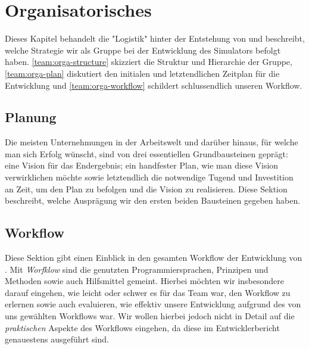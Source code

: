 
\section{Organisatorisches}
\label{team:orga}

Dieses Kapitel behandelt die "Logistik" hinter der Entstehung von \erasim{} und
beschreibt, welche Strategie wir als Gruppe bei der Entwicklung des Simulators
befolgt haben. \autoref{team:orga-structure} skizziert die Struktur und
Hierarchie der Gruppe, \autoref{team:orga-plan} diskutiert den initialen und
letztendlichen Zeitplan für die Entwicklung und
\autoref{team:orga-workflow} schildert schlussendlich unseren Workflow.



\subsection{Planung}
\label{team:orga-plan}

Die meisten Unternehmungen in der Arbeitswelt und darüber hinaus, für welche man
sich Erfolg wünscht, sind von drei essentiellen Grundbausteinen geprägt: eine
Vision für das Endergebnis; ein handfester Plan, wie man diese Vision
verwirklichen möchte sowie letztendlich die notwendige Tugend und Investition an
Zeit, um den Plan zu befolgen und die Vision zu realisieren. Diese Sektion
beschreibt, welche Ausprägung wir den ersten beiden Bausteinen gegeben haben.





\subsection{Workflow}
\label{team:orga-workflow}
\vspace{-0.3cm}

Diese Sektion gibt einen Einblick in den gesamten Workflow der Entwicklung von
\erasim{}. Mit \emph{Worfklow} sind die genutzten Programmiersprachen, Prinzipen
und Methoden sowie auch Hilfsmittel gemeint. Hierbei möchten wir insbesondere
darauf eingehen, wie leicht oder schwer es für das Team war, den Workflow zu
erlernen sowie auch evaluieren, wie effektiv unsere Entwicklung aufgrund des von
uns gewählten Workflows war. Wir wollen hierbei jedoch nicht in Detail auf die
\emph{praktischen} Aspekte des Workflows eingehen, da diese im Entwicklerbericht
genauestens ausgeführt sind.





